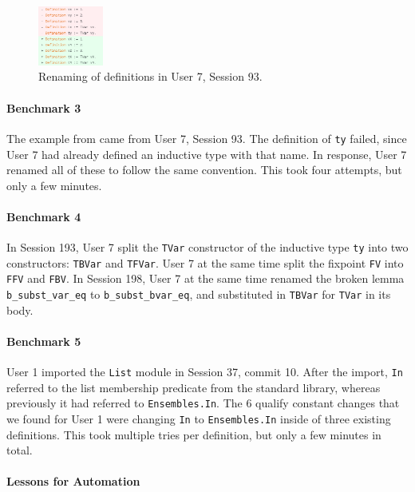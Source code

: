 \begin{figure}
  \includegraphics[width=0.19\textwidth]{maintenance/fig/refactor.png}
  \caption{Renaming of definitions in User 7, Session 93.}
  \label{fig:refactor}
\end{figure}

\paragraph{Benchmark 3}

The example from  came from User 7, Session 93.
The definition of \lstinline{ty} failed, since User 7 had already
defined an inductive type with that name.
In response, User 7 renamed all of these
to follow the same convention.
This took four attempts, but only a few minutes.

\paragraph{Benchmark 4}

In Session 193, User 7 split the \lstinline{TVar} constructor
of the inductive type \lstinline{ty} into two constructors:
\lstinline{TBVar} and \lstinline{TFVar}. User 7 at the same time
split the fixpoint \lstinline{FV} into \lstinline{FFV} and
\lstinline{FBV}.
In Session 198, User 7 at the same time renamed the broken lemma
\lstinline{b_subst_var_eq} to \lstinline{b_subst_bvar_eq},
and substituted in \lstinline{TBVar} for \lstinline{TVar} in its body.

\paragraph{Benchmark 5}

User 1 imported the \lstinline{List} module in Session 37, commit 10.
After the import, \lstinline{In} referred to the list
membership predicate from the standard library, whereas previously it had
referred to \lstinline{Ensembles.In}. The 6 qualify constant changes that we
found for User 1 were changing \lstinline{In} to \lstinline{Ensembles.In}
inside of three existing definitions.
This took multiple tries per definition,
but only a few minutes in total.

\paragraph{Lessons for Automation}

